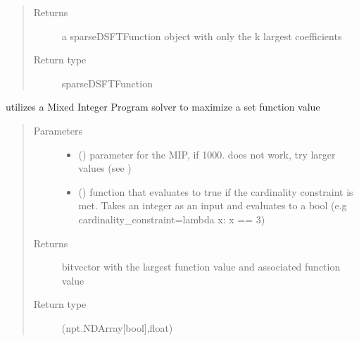 \documentclass[letterpaper,10pt,english]{sphinxmanual}
\begin{document}
\begin{fulllineitems}
\begin{fulllineitems}
\begin{quote}
\begin{description}
\item[{Returns}] \leavevmode
\sphinxAtStartPar
a sparseDSFTFunction object with only the k largest coefficients

\item[{Return type}] \leavevmode
\sphinxAtStartPar
sparseDSFTFunction

\end{description}\end{quote}

\end{fulllineitems}


\begin{fulllineitems}
\label{\detokenize{setFTs:setFTs.setfunctions.SparseDSFTFunction.maximize_MIP}}
\sphinxAtStartPar
utilizes a Mixed Integer Program solver to maximize  a set function value
\begin{quote}\begin{description}
\item[{Parameters}] \leavevmode\begin{itemize}
\item {} 
\sphinxAtStartPar
{} () \textendash{} parameter for the MIP, if 1000. does not work, try larger values (see )

\item {} 
\sphinxAtStartPar
{} () \textendash{} function that evaluates to true if the cardinality constraint is met. Takes an integer as an input and evaluates to a bool (e.g cardinality\_constraint=lambda x: x == 3)

\end{itemize}

\item[{Returns}] \leavevmode
\sphinxAtStartPar
bitvector with the largest function value and associated function value

\item[{Return type}] \leavevmode
\sphinxAtStartPar
(npt.NDArray{[}bool{]},float)


\end{description}
\end{quote}
\end{fulllineitems}
\end{fulllineitems}
\end{document}

